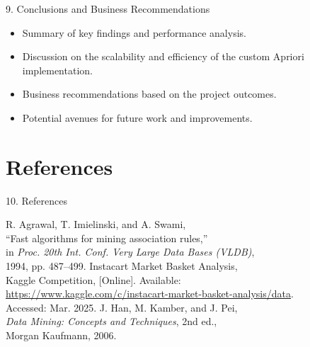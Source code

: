 \documentclass{beamer}
\begin{document}
\begin{frame}{9. Conclusions and Business Recommendations}
    \begin{itemize}
        \item Summary of key findings and performance analysis.
        \item Discussion on the scalability and efficiency of the custom Apriori implementation.
        \item Business recommendations based on the project outcomes.
        \item Potential avenues for future work and improvements.
    \end{itemize}
\end{frame}

\section{References}

\begin{frame}{10. References}
    \begin{thebibliography}{9}
         R. Agrawal, T. Imielinski, and A. Swami,
        \\ ``Fast algorithms for mining association rules,'' \\
        in \textit{Proc. 20th Int. Conf. Very Large Data Bases (VLDB)}, 
        \\ 1994, pp. 487--499.
         Instacart Market Basket Analysis, \\
        Kaggle Competition, [Online]. Available:\\
         \url{https://www.kaggle.com/c/instacart-market-basket-analysis/data}.\\
         Accessed: Mar. 2025.
         J. Han, M. Kamber, and J. Pei, \\
        \textit{Data Mining: Concepts and Techniques}, 2nd ed.,
        \\Morgan Kaufmann, 2006.
    \end{thebibliography}
\end{frame}
\end{document}
